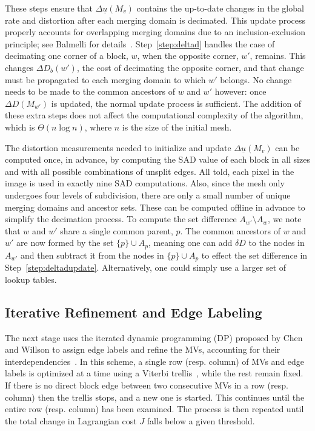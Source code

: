 \documentclass[11pt,letterpaper]{article}
\begin{document}
These steps ensure that $\Delta\underline{u}(M_v)$ contains the up-to-date
 changes in the global rate and distortion after each merging domain is
 decimated.
This update process properly accounts for overlapping merging domains due to an
 inclusion-exclusion principle; see Balmelli for details~\cite{Bal01}.
Step~\ref{step:deltad} handles the case of decimating one corner of a block,
 $w$, when the opposite corner, $w'$, remains.
This changes $\Delta D_b(w')$, the cost of decimating the opposite corner, and
 that change must be propagated to each merging domain to which $w'$ belongs.
No change needs to be made to the common ancestors of $w$ and $w'$ however:
 once $\Delta D(M_{w'})$ is updated, the normal update process is sufficient.
The addition of these extra steps does not affect the computational complexity
 of the algorithm, which is $\Theta(n\log n)$, where $n$ is the size of the
 initial mesh.

The distortion measurements needed to initialize and update
 $\Delta\underline{u}(M_v)$ can be computed once, in advance, by computing the
 SAD value of each block in all sizes and with all possible combinations of
 unsplit edges.
All told, each pixel in the image is used in exactly nine SAD computations.
Also, since the mesh only undergoes four levels of subdivision, there are only
 a small number of unique merging domains and ancestor sets.
These can be computed offline in advance to simplify the decimation process.
To compute the set difference $A_{w'}\setminus A_{w}$, we note that $w$ and
 $w'$ share a single common parent, $p$.
The common ancestors of $w$ and $w'$ are now formed by the set
 $\{p\}\cup A_{p}$, meaning one can add $\delta D$ to the nodes in $A_{w'}$ and
 then subtract it from the nodes in $\{p\}\cup A_{p}$ to effect the set
 difference in Step~\ref{step:deltadupdate}.
Alternatively, one could simply use a larger set of lookup tables.

\subsection{Iterative Refinement and Edge Labeling}

The next stage uses the iterated dynamic programming (DP) proposed by Chen and
 Willson to assign edge labels and refine the MVs, accounting for their
 interdependencies~\cite{CW00}.
In this scheme, a single row (resp. column) of MVs and edge labels is optimized
 at a time using a Viterbi trellis~\cite{For73}, while the rest remain fixed.
If there is no direct block edge between two consecutive MVs in a row (resp.
 column) then the trellis stops, and a new one is started.
This continues until the entire row (resp. column) has been examined.
The process is then repeated until the total change in Lagrangian cost $J$
 falls below a given threshold.
\end{document}
